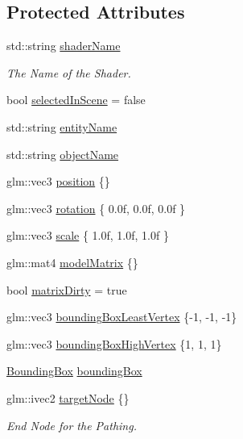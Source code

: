 \subsection*{Protected Attributes}
\begin{DoxyCompactItemize}
\item 
std\+::string \mbox{\hyperlink{classpiolot_1_1_entity_aa2eeb64fbf3f1445b2895ac680ba7e36}{shader\+Name}}
\begin{DoxyCompactList}\small\item\em The Name of the Shader. \end{DoxyCompactList}\item 
bool \mbox{\hyperlink{classpiolot_1_1_entity_a50e4d7090890c7bedc3dffa1fe4d3dc9}{selected\+In\+Scene}} = false
\item 
std\+::string \mbox{\hyperlink{classpiolot_1_1_entity_acdc85c4db87446266e0e04392d54cd11}{entity\+Name}}
\item 
std\+::string \mbox{\hyperlink{classpiolot_1_1_entity_a453c36793cfbab8662e28a8c10986432}{object\+Name}}
\item 
glm\+::vec3 \mbox{\hyperlink{classpiolot_1_1_entity_a1996e97527821230db17bc0c93a9ba26}{position}} \{\}
\item 
glm\+::vec3 \mbox{\hyperlink{classpiolot_1_1_entity_ad490e079062ae866cbd14afbc768c37f}{rotation}} \{ 0.\+0f, 0.\+0f, 0.\+0f \}
\item 
glm\+::vec3 \mbox{\hyperlink{classpiolot_1_1_entity_a80bbefe25b4316190caf5d8cc77bd125}{scale}} \{ 1.\+0f, 1.\+0f, 1.\+0f \}
\item 
glm\+::mat4 \mbox{\hyperlink{classpiolot_1_1_entity_abca37f3906e85c0f184f1c2ffe627a7e}{model\+Matrix}} \{\}
\item 
bool \mbox{\hyperlink{classpiolot_1_1_entity_ae8f4e05ad6742e55a3ed3792d21c3282}{matrix\+Dirty}} = true
\item 
glm\+::vec3 \mbox{\hyperlink{classpiolot_1_1_entity_ac6c2e3e5d992af3ce7411667ffaca70f}{bounding\+Box\+Least\+Vertex}} \{-\/1, -\/1, -\/1\}
\item 
glm\+::vec3 \mbox{\hyperlink{classpiolot_1_1_entity_a19516d394f36d44c42e742403ff04341}{bounding\+Box\+High\+Vertex}} \{1, 1, 1\}
\item 
\mbox{\hyperlink{classpiolot_1_1_bounding_box}{Bounding\+Box}} \mbox{\hyperlink{classpiolot_1_1_entity_a133cd55e173decca797dde8d6c4714d3}{bounding\+Box}}
\item 
glm\+::ivec2 \mbox{\hyperlink{classpiolot_1_1_entity_a5038500567bdea17e4c1a4070a7ccef3}{target\+Node}} \{\}
\begin{DoxyCompactList}\small\item\em End Node for the Pathing. \end{DoxyCompactList}\end{DoxyCompactItemize}


